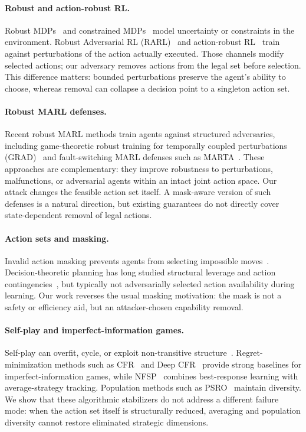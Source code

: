 \documentclass{article}
\begin{document}
\paragraph{Robust and action-robust RL.}
Robust MDPs~\citep{iyengar2005robust,nilim2005robust} and constrained MDPs~\citep{altman1999constrained} model uncertainty or constraints in the environment. Robust Adversarial RL (RARL)~\citep{pinto2017robust} and action-robust RL~\citep{tessler2019action} train against perturbations of the action actually executed. Those channels modify selected actions; our adversary removes actions from the legal set before selection. This difference matters: bounded perturbations preserve the agent's ability to choose, whereas removal can collapse a decision point to a singleton action set.

\paragraph{Robust MARL defenses.}
Recent robust MARL methods train agents against structured adversaries, including game-theoretic robust training for temporally coupled perturbations (GRAD)~\citep{liang2024grad} and fault-switching MARL defenses such as MARTA~\citep{mguni2025marta}. These approaches are complementary: they improve robustness to perturbations, malfunctions, or adversarial agents within an intact joint action space. Our attack changes the feasible action set itself. A mask-aware version of such defenses is a natural direction, but existing guarantees do not directly cover state-dependent removal of legal actions.

\paragraph{Action sets and masking.}
Invalid action masking prevents agents from selecting impossible moves~\citep{huang2022closer}. Decision-theoretic planning has long studied structural leverage and action contingencies~\citep{boutilier1999decision}, but typically not adversarially selected action availability during learning. Our work reverses the usual masking motivation: the mask is not a safety or efficiency aid, but an attacker-chosen capability removal.

\paragraph{Self-play and imperfect-information games.}
Self-play can overfit, cycle, or exploit non-transitive structure~\citep{balduzzi2019open,lanctot2019openspiel}. Regret-minimization methods such as CFR~\citep{zinkevich2007regret} and Deep CFR~\citep{brown2019deep} provide strong baselines for imperfect-information games, while NFSP~\citep{heinrich2016deep} combines best-response learning with average-strategy tracking. Population methods such as PSRO~\citep{lanctot2017unified} maintain diversity. We show that these algorithmic stabilizers do not address a different failure mode: when the action set itself is structurally reduced, averaging and population diversity cannot restore eliminated strategic dimensions.
\end{document}
